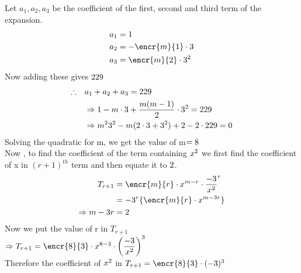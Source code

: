 \begin{solution}[\fullpage]
Let $a_{1}, a_{2},a_{3}$ be the coefficient of the first, second and third term of the expansion. \\
	\begin{align}
	a_{1} &= 1 \\ 
	a_{2} &= -\encr{m}{1} \cdot \vbone \\
	a_{3} &= \encr{m}{2} \cdot \vbone^{2} 
	\end{align}    
Now adding these gives $229$\\
\begin{align}
\therefore \quad &a_{1} + a_{2} + a_{3} = 229 \\
&\Rightarrow 1 - m\cdot3 + \dfrac{m(m-1)}{2} \cdot 3^{2} = 229 \\
&\Rightarrow m^{2}3^{2} - m(2\cdot 3 + 3^{2}) + 2 - 2\cdot 229 = 0 
\end{align}
Solving the quadratic for m, we get the value of m$ = 8$ \\ 
Now , to find the coefficient of the term containing $x^{2}$ we first find the coefficient of x in $(r+1)^{th}$ term and then equate it to $2$. \\
\begin{align}
T_{r+1} &= \encr{m}{r} \cdot x^{m-r} \cdot {\dfrac{-\vbone}{x^{2}}}^{r} \\
&= {-\vbone}^{r} \lbrace \encr{m}{r} \cdot x^{m-3r} \rbrace \\
\Rightarrow m - 3r &=\vbfour 
\end{align} 
Now we put the value of r in ${T}_{r+1}$\\
$\Rightarrow T_{r+1} = \encr{\vbthree}{\vbfive} \cdot x^{\vbthree-\vbfive} \cdot {\left(\dfrac{-\vbone}{x^{2}}\right)}^{\vbfive}$ \\
Therefore the coefficient of $x^{2}$ in $T_{r+1} = \encr{\vbthree}{\vbfive} \cdot (-\vbone)^{\vbfive}$
\end{solution}


